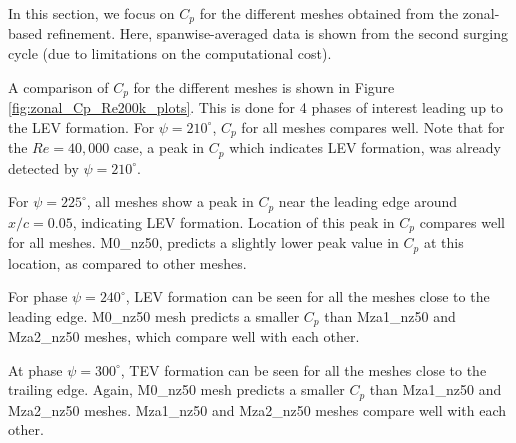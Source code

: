 
In this section, we focus on $C_p$ for the different meshes obtained from the zonal-based refinement.
Here, spanwise-averaged data is shown from the second surging cycle (due to limitations on the computational cost).

A comparison of $C_p$ for the different meshes is shown in Figure \ref{fig:zonal_Cp_Re200k_plots}. 
This is done for 4 phases of interest leading up to the LEV formation. 
For $\psi=210^\circ$, $C_p$ for all meshes compares well. Note that for the $Re=40,000$ case, a peak in $C_p$ which indicates LEV formation, was already detected by $\psi=210^\circ$. 

For $\psi=225^\circ$, all meshes show a peak in $C_p$ near the leading edge around $x/c = 0.05$, indicating LEV formation.
Location of this peak in $C_p$ compares well for all meshes.
M0\_nz50, predicts a slightly lower peak value in $C_p$ at this location, as compared to other meshes.

For phase $\psi=240^\circ$, LEV formation can be seen for all the meshes close to the leading edge.
M0\_nz50 mesh predicts a smaller $C_p$ than Mza1\_nz50 and Mza2\_nz50 meshes, which compare well with each other.

At phase $\psi=300^\circ$, TEV formation can be seen for all the meshes close to the trailing edge.
Again, M0\_nz50 mesh predicts a smaller $C_p$ than Mza1\_nz50 and Mza2\_nz50 meshes.
Mza1\_nz50 and Mza2\_nz50 meshes compare well with each other.


